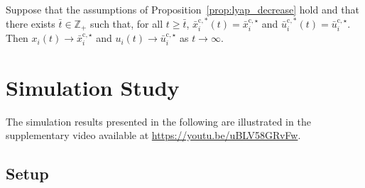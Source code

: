 \documentclass[twocolumn]{autart}
\begin{document}
\begin{corollary}
\label{cor:fixed_ss_convergence}
Suppose that the assumptions of Proposition~\ref{prop:lyap_decrease} hold and that there exists \(\bar t\in\mathbb Z_+\) such that, for all \(t\ge\bar t\), \(\bar x_i^{\mathrm c,\ast}(t)=\bar x_i^{\mathrm c,\star}\) and \(\bar u_i^{\mathrm c,\ast}(t)=\bar u_i^{\mathrm c,\star}\). Then \(x_i(t)\to \bar x_i^{\mathrm c,\star}\) and \(u_i(t)\to \bar u_i^{\mathrm c,\star}\) as \(t\to\infty\).
\end{corollary}
\section{Simulation Study}
\label{sec:sim}
The simulation results presented in the following are illustrated in the supplementary video available at \url{https://youtu.be/uBLV58GRvFw}.
\subsection{Setup}
\label{subsec:sim_setup}
\end{document}
